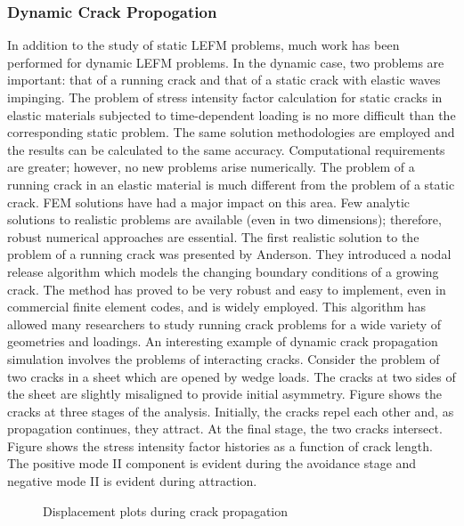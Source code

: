\documentclass[12pt]{article}
\begin{document}
\subsubsection{Dynamic Crack Propogation}
In addition to the study of static LEFM problems, much work has been performed for
dynamic LEFM problems. In the dynamic case, two problems are important: that of a running
crack and that of a static crack with elastic waves impinging. The problem of stress intensity factor
calculation for static cracks in elastic materials subjected to time-dependent loading is no more
difficult than the corresponding static problem. The same solution methodologies are employed and
the results can be calculated to the same accuracy. Computational requirements are greater;
however, no new problems arise numerically. The problem of a running crack in an elastic material
is much different from the problem of a static crack. FEM solutions have had a major impact on
this area. Few analytic solutions to realistic problems are available (even in two dimensions);
therefore, robust numerical approaches are essential. The first realistic solution to the problem of
a running crack was presented by Anderson. They introduced a nodal release algorithm
which models the changing boundary conditions of a growing crack. The method has proved to
be very robust and easy to implement, even in commercial finite element codes, and is widely
employed. This algorithm has allowed many researchers to study running crack problems for a wide
variety of geometries and loadings.  An interesting example of dynamic crack propagation
simulation involves the problems of interacting cracks. Consider the problem of two cracks in a
sheet which are opened by wedge loads. The cracks at two sides of the sheet are slightly
misaligned to provide initial asymmetry. Figure shows the cracks at three stages of the analysis.
Initially, the cracks repel each other and, as propagation continues, they attract. At the final stage,
the two cracks intersect. Figure shows the stress intensity factor histories as a function of crack
length. The positive mode II component is evident during the avoidance stage and negative mode
II is evident during attraction.


\begin{figure}[H]
    \centering
    \captionsetup{labelformat=empty}
    \caption{Displacement plots during crack propagation}  
\end{figure}
\end{document}
